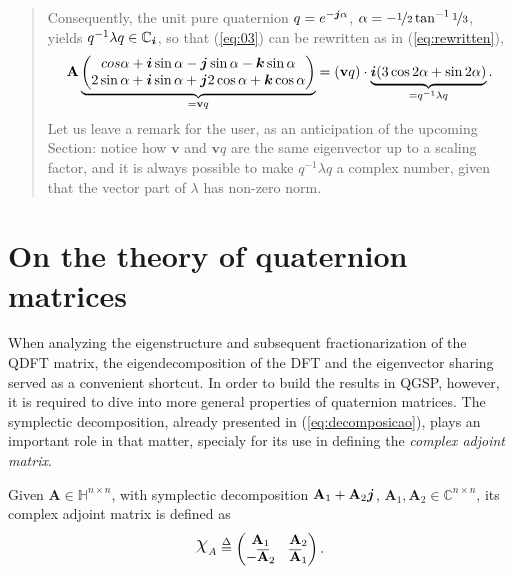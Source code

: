 \begin{quotation}
\begin{example}
Consequently, the unit pure quaternion $ q = e^{- \boldsymbol{j} \alpha} $, $ \alpha = - \displaystyle \nicefrac{1}{2} \tan^{-1} \nicefrac{1}{3} $, yields $ q^{-1} \lambda q \in \mathbb{C}_{\boldsymbol{i}}$, so that (\ref{eq:03}) can be rewritten as in (\ref{eq:rewritten}),
\begin{equation}
\mathbf{A} \underbrace{\begin{pmatrix}
cos \alpha + \boldsymbol{i} \sin \alpha - \boldsymbol{j} \sin \alpha - \boldsymbol{k} \sin \alpha \\
2 \sin \alpha + \boldsymbol{i} \sin \alpha + \boldsymbol{j} 2 \cos \alpha + \boldsymbol{k} \cos \alpha
\end{pmatrix}}_{= \mathbf{v} q} =
(\mathbf{v} q) \cdot \underbrace{\boldsymbol{i} (3 \cos 2\alpha + \sin 2\alpha)}_{= q^{-1} \lambda q}.
\end{equation}
Let us leave a remark for the user, as an anticipation of the upcoming Section: notice how $\mathbf{v}$ and $\mathbf{v}q$ are the same eigenvector up to a scaling factor, and it is always possible to make $q^{-1} \lambda q$ a complex number, given that the vector part of $\lambda$ has non-zero norm.
\end{example}
\end{quotation}


\section{On the theory of quaternion matrices}

When analyzing the eigenstructure and subsequent fractionarization of the QDFT matrix, the eigendecomposition of the DFT and the eigenvector sharing served as a convenient shortcut. In order to build the results in QGSP, however, it is required to dive into more general properties of quaternion matrices. The symplectic decomposition, already presented in (\ref{eq:decomposicao}), plays an important role in that matter, specialy for its use in defining the \textit{complex adjoint matrix}.

\begin{definition}
\label{def:complexadjoint}
Given $ \mathbf{A} \in \mathbb{H}^{n \times n} $, with symplectic decomposition $ \mathbf{A}_1 + \mathbf{A}_2 \boldsymbol{j}$, $ \mathbf{A}_1,\mathbf{A}_2 \in \mathbb{C}^{n \times n} $, its complex adjoint matrix is defined as
\begin{equation}
\rchi_{A} \overset{\Delta}{=}
\begin{pmatrix}
\mathbf{A}_1 & \mathbf{A}_2\\ 
- \overline{\mathbf{A}}_2 & \overline{\mathbf{A}}_1
\end{pmatrix}.
\end{equation}
\end{definition}

